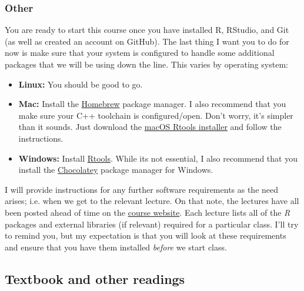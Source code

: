 \documentclass[12]{article}
\begin{document}
\vspace{-0.25cm}
\subsubsection*{Other}

You are ready to start this course once you have installed R, RStudio, and Git (as well as created an account on GitHub). The last thing I want you to do for now is make sure that your system is configured to handle some additional packages that we will be using down the line. This varies by operating system:

\begin{itemize}
	\item \textbf{Linux:} You should be good to go. 
	\item \textbf{Mac:} Install the \href{https://brew.sh/}{Homebrew} package manager. I also recommend that you make sure your C++ toolchain is configured/open. Don't worry, it's simpler than it sounds. Just download the \href{https://github.com/rmacoslib/r-macos-rtools#installer-package-for-macos-r-toolchain-}{macOS Rtools installer} and follow the instructions.
	\item \textbf{Windows:} Install \href{https://cran.r-project.org/bin/windows/Rtools/}{Rtools}. While its not essential, I also recommend that you install the \href{https://chocolatey.org/}{Chocolatey} package manager for Windows.
\end{itemize}

I will provide instructions for any further software requirements as the need arises; i.e. when we get to the relevant lecture. On that note, the lectures have all been posted ahead of time on the \href{https://github.com/uo-ec607}{course website}. Each lecture lists all of the \textit{R} packages and external libraries (if relevant) required for a particular class. I'll try to remind you, but my expectation is that you will look at these requirements and ensure that you have them installed \textit{before} we start class. 

\subsection*{Textbook and other readings}
\end{document}
